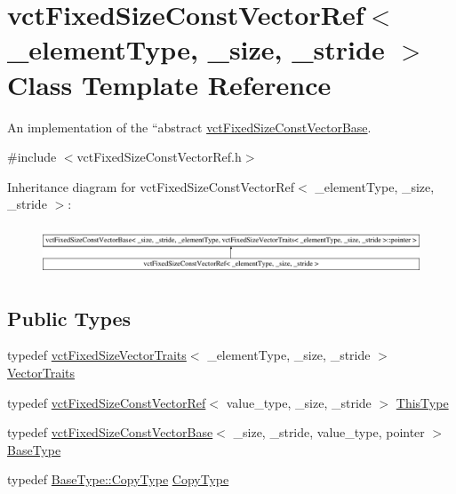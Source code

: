 \hypertarget{classvct_fixed_size_const_vector_ref}{}\section{vct\+Fixed\+Size\+Const\+Vector\+Ref$<$ \+\_\+element\+Type, \+\_\+size, \+\_\+stride $>$ Class Template Reference}
\label{classvct_fixed_size_const_vector_ref}


An implementation of the ``abstract\textquotesingle{}\textquotesingle{} \hyperlink{classvct_fixed_size_const_vector_base}{vct\+Fixed\+Size\+Const\+Vector\+Base}.  




{\ttfamily \#include $<$vct\+Fixed\+Size\+Const\+Vector\+Ref.\+h$>$}

Inheritance diagram for vct\+Fixed\+Size\+Const\+Vector\+Ref$<$ \+\_\+element\+Type, \+\_\+size, \+\_\+stride $>$\+:\begin{figure}[H]
\begin{center}
\leavevmode
\includegraphics[height=1.475626cm]{d0/dd6/classvct_fixed_size_const_vector_ref}
\end{center}
\end{figure}
\subsection*{Public Types}
\begin{DoxyCompactItemize}
\item 
typedef \hyperlink{classvct_fixed_size_vector_traits}{vct\+Fixed\+Size\+Vector\+Traits}$<$ \+\_\+element\+Type, \+\_\+size, \+\_\+stride $>$ \hyperlink{classvct_fixed_size_const_vector_ref_a3babba555c9429381db7df666b708aca}{Vector\+Traits}
\item 
typedef \hyperlink{classvct_fixed_size_const_vector_ref}{vct\+Fixed\+Size\+Const\+Vector\+Ref}$<$ value\+\_\+type, \+\_\+size, \+\_\+stride $>$ \hyperlink{classvct_fixed_size_const_vector_ref_a21e7349968a7377aaeacacf7803e05e6}{This\+Type}
\item 
typedef \hyperlink{classvct_fixed_size_const_vector_base}{vct\+Fixed\+Size\+Const\+Vector\+Base}$<$ \+\_\+size, \+\_\+stride, value\+\_\+type, pointer $>$ \hyperlink{classvct_fixed_size_const_vector_ref_a669fc6db8058bda695431756ce54f59d}{Base\+Type}
\item 
typedef \hyperlink{classvct_fixed_size_const_vector_base_aaf3accb7cec5765478b5d8fa39c22408}{Base\+Type\+::\+Copy\+Type} \hyperlink{classvct_fixed_size_const_vector_ref_a14ea8a2cf943f5a4f5f9d2def5ce48de}{Copy\+Type}
\end{DoxyCompactItemize}
